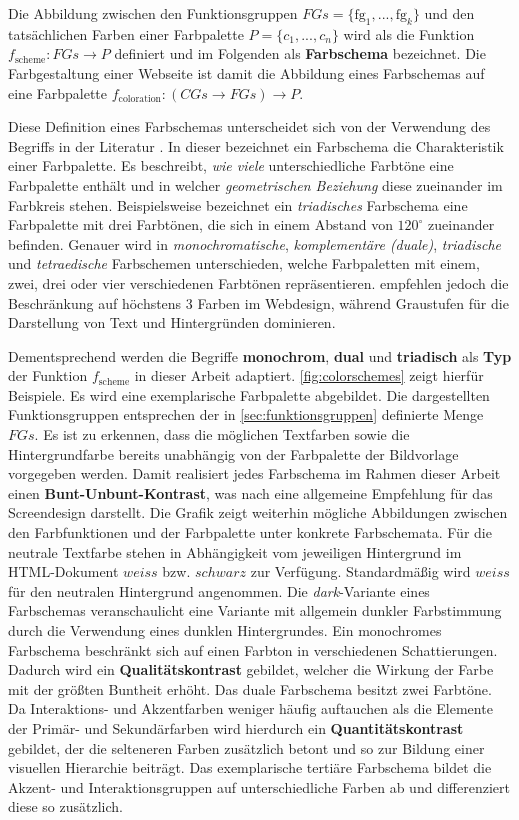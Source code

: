Die Abbildung zwischen den Funktionsgruppen $FGs = \{\text{fg}_1, ... , \text{fg}_k\}$ und den tatsächlichen Farben einer Farbpalette $P = \{c_1, ... , c_n\}$ wird als die Funktion $f_\text{scheme}: FGs \to P$ definiert und im Folgenden als \textbf{Farbschema} bezeichnet. Die Farbgestaltung einer Webseite ist damit die Abbildung eines Farbschemas auf eine Farbpalette $f_\text{coloration}: (CGs \to FGs) \to P$.

Diese Definition eines Farbschemas unterscheidet sich von der Verwendung des Begriffs in der Literatur \citep{webdesign}. In dieser bezeichnet ein Farbschema die Charakteristik einer Farbpalette. Es beschreibt, \emph{wie viele} unterschiedliche Farbtöne eine Farbpalette enthält und in welcher \emph{geometrischen Beziehung} diese zueinander im Farbkreis stehen. Beispielsweise bezeichnet ein \emph{triadisches} Farbschema eine Farbpalette mit drei Farbtönen, die sich in einem Abstand von $120^{\circ}$ zueinander befinden. Genauer wird in  \emph{monochromatische}, \emph{komplementäre (duale)}, \emph{triadische} und \emph{tetraedische} Farbschemen unterschieden, welche Farbpaletten mit einem, zwei, drei oder vier verschiedenen Farbtönen repräsentieren. \citep{underestimated, smashing, google} empfehlen jedoch die Beschränkung auf höchstens 3 Farben im Webdesign, während Graustufen für die Darstellung von Text und Hintergründen dominieren.
    
Dementsprechend werden die Begriffe \textbf{monochrom}, \textbf{dual} und \textbf{triadisch} als \textbf{Typ} der Funktion $f_\text{scheme}$ in dieser Arbeit adaptiert. \autoref{fig:colorschemes} zeigt hierfür Beispiele. Es wird eine exemplarische Farbpalette abgebildet. Die dargestellten Funktionsgruppen entsprechen der in \autoref{sec:funktionsgruppen} definierte Menge $FGs$. Es ist zu erkennen, dass die möglichen Textfarben sowie die Hintergrundfarbe bereits unabhängig von der Farbpalette der Bildvorlage vorgegeben werden. Damit realisiert jedes Farbschema im Rahmen dieser Arbeit einen \textbf{Bunt-Unbunt-Kontrast}, was nach \citet{webx0} eine allgemeine Empfehlung für das Screendesign darstellt. Die Grafik zeigt weiterhin mögliche Abbildungen zwischen den Farbfunktionen und der Farbpalette unter \glqq{}konkrete Farbschemata\grqq{}. Für die neutrale Textfarbe stehen in Abhängigkeit vom jeweiligen Hintergrund im HTML-Dokument $weiss$ bzw. $schwarz$ zur Verfügung. Standardmäßig wird $weiss$ für den neutralen Hintergrund angenommen. Die \emph{dark}-Variante eines Farbschemas veranschaulicht eine Variante mit allgemein dunkler Farbstimmung durch die Verwendung eines dunklen Hintergrundes. Ein monochromes Farbschema beschränkt sich auf einen Farbton in verschiedenen Schattierungen. Dadurch wird ein \textbf{Qualitätskontrast} gebildet, welcher die Wirkung der Farbe mit der größten Buntheit erhöht. Das duale Farbschema besitzt zwei Farbtöne. Da Interaktions- und Akzentfarben weniger häufig auftauchen als die Elemente der Primär- und Sekundärfarben wird hierdurch ein \textbf{Quantitätskontrast} gebildet, der die selteneren Farben zusätzlich betont und so zur Bildung einer visuellen Hierarchie beiträgt. Das exemplarische tertiäre Farbschema bildet die Akzent- und Interaktionsgruppen auf unterschiedliche Farben ab und differenziert diese so zusätzlich. 

